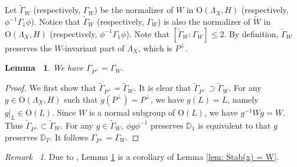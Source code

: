 \documentclass[12pt,reqno,a4paper]{amsart}
\newtheorem{lem}[thm]{Lemma~}
\theoremstyle{remark}
\newtheorem{rmk}[thm]{Remark~}
\theoremstyle{definition}
\newcommand{\DD}{\mathbb{D}}
\newcommand\Or{\mathrm{O}}
\begin{document}
Let $\widetilde\Gamma_W$ (respectively, $\Gamma_W$) be the normalizer of $W$ in $\Or(\Lambda_X,H)$ (respectively, $\phi^{-1}\Gamma_1\phi$). 
Notice that $\widetilde\Gamma_W$ (respectively, $\Gamma_W$) is also the normalizer of $\widetilde{W}$ in $\Or(\Lambda_X,H)$ (respectively, $\phi^{-1}\Gamma_1\phi$). 
Note that $[\widetilde{\Gamma}_W:\Gamma_W]\le 2$.
By definition, $\widetilde\Gamma_W$ preserves the $W$-invariant part of $\Lambda_X$, which is $P^\perp$.

\begin{lem}
\label{lem: Gamma_P^perp = Gamma_W}
    We have $\Gamma_{P^\perp}=\Gamma_W$.
\end{lem}
\begin{proof}
    We first show that $\widetilde\Gamma_{P^\perp}=\widetilde\Gamma_W$.
    It is clear that $\widetilde\Gamma_{P^\perp} \supset \widetilde\Gamma_W$.
    For any $g\in\Or(\Lambda_X,H)$ such that $g(P^\perp)=P^\perp$, we have $g(L)=L$, namely $g|_L\in\Or(L)$.
    Since $W$ is a normal subgroup of $\Or(L)$, we have $g^{-1}Wg=W$.
    Thus $\widetilde\Gamma_{P^\perp} \subset \widetilde\Gamma_W$.
    For any $g\in\widetilde\Gamma_W$, $\phi g\phi^{-1}$ preserves $\DD_1$ is equivalent to that $g$ preserves $\DD_T$.
    It follows $\Gamma_{P^\perp}=\Gamma_W$.
\end{proof}

\begin{rmk}
    Due to \cite[Lemma A.4]{yu2020fourfolds}, Lemma \ref{lem: Gamma_P^perp = Gamma_W} is a corollary of Lemma \ref{lem: Stab(x) = W}.
\end{rmk}


\end{document}
